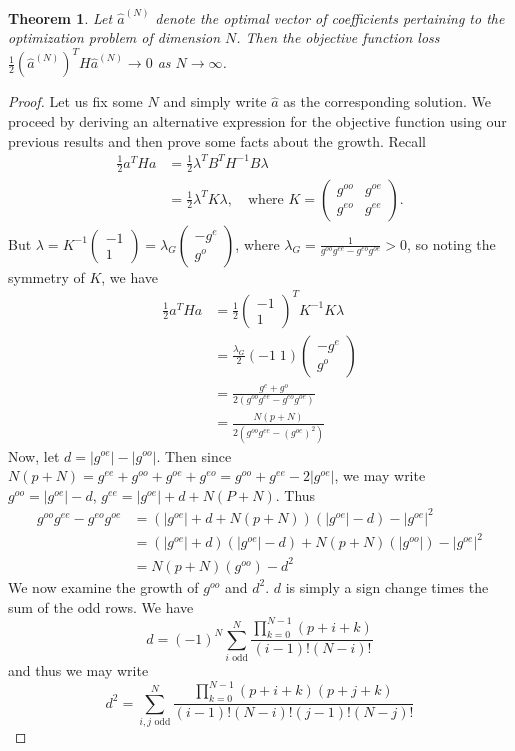 \documentclass{article}
\newtheorem{thm}{Theorem}[section]
\theoremstyle{definition}
\theoremstyle{remark}
\numberwithin{equation}{section}
\begin{document}
\begin{thm}
Let $\hat{a}^{(N)}$ denote the optimal vector of coefficients pertaining to the optimization problem of dimension $N$. Then the objective function loss $\frac{1}{2}(\hat{a}^{(N)})^T H \hat{a}^{(N)} \to 0$ as $N\to \infty$.
\end{thm}
\begin{proof}
Let us fix some $N$ and simply write $\hat{a}$ as the corresponding solution. We proceed by deriving an alternative expression for the objective function using our previous results and then prove some facts about the growth. Recall
\begin{align*}
\frac{1}{2}a^T Ha &=\frac{1}{2} \lambda^T B^T H^{-1}B \lambda \\
&= \frac{1}{2} \lambda^T K\lambda, \quad \text{where } K= \begin{pmatrix} g^{oo} & g^{oe} \\
g^{eo} & g^{ee} \end{pmatrix}.
\end{align*} But $\lambda = K^{-1} \begin{pmatrix} -1 \\ 1 \end{pmatrix} = \lambda_G \begin{pmatrix} -g^e \\ g^o \end{pmatrix}$, where $\lambda_G = \frac{1}{g^{oo} g^{ee} - g^{eo}g^{oe}} >0$, so noting the symmetry of $K$, we have 
\begin{align*}
\frac{1}{2} a^T Ha &= \frac{1}{2}\begin{pmatrix} -1 \\ 1\end{pmatrix} ^T K^{-1} K \lambda \\ 
&= \frac{\lambda_G}{2}(-1 \; 1) \begin{pmatrix} -g^e \\ g^o \end{pmatrix}\\
&= \frac{g^e + g^o}{2(g^{oo} g^{ee} - g^{eo}g^{oe})}\\
&= \frac{N(p+N)}{2(g^{oo}g^{ee} - (g^{oe})^2)}
\end{align*}
Now, let $d=|g^{oe}| - |g^{oo}|$. Then since $N(p+N) = g^{ee} + g^{oo} + g^{oe} + g^{eo} = g^{oo}+g^{ee} - 2|g^{oe}|$, we may write $g^{oo} = |g^{oe}|-d$, $g^{ee} = |g^{oe}| + d + N(P+N)$. Thus 
\begin{align*}
g^{oo} g^{ee} - g^{eo}g^{oe} &=  (|g^{oe}| + d + N(p+N)) (|g^{oe}| - d) - |g^{oe}|^2 \\
&= (|g^{oe}|+d)(|g^{oe}| - d) + N(p+N)(|g^{oo}|) - |g^{oe}|^2\\
&= N(p+N)(g^{oo}) - d^2
\end{align*}
We now examine the growth of $g^{oo}$ and $d^2$. $d$ is simply a sign change times the sum of the odd rows. We have
\[d = (-1)^N \sum_{i \text{ odd}}^N \frac{\prod_{k=0}^{N-1} (p+i+k)}{(i-1)!(N-i)!} \] 
and thus we may write 
\[d^2 = \sum_{i,j \text{ odd}}^N 
\frac{\prod_{k=0}^{N-1} (p+i+k)(p+j+k)}{(i-1)! (N-i)! (j-1)! (N-j)!} \]


\end{proof}
\end{document}
